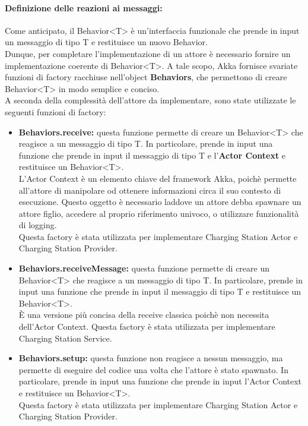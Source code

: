 \paragraph{Definizione delle reazioni ai messaggi:}
Come anticipato, il Behavior<T> è un'interfaccia funzionale che prende in input un messaggio di tipo T e restituisce un nuovo Behavior.\\
Dunque, per completare l'implementazione di un attore è necessario fornire un implementazione coerente di Behavior<T>. A tale scopo, Akka fornisce svariate funzioni di factory racchiuse nell'object \textbf{Behaviors}, che permettono di creare Behavior<T> in modo semplice e conciso.\\
A seconda della complessità dell'attore da implementare, sono state utilizzate le seguenti funzioni di factory:
\begin{itemize}
      \item \textbf{Behaviors.receive:} questa funzione permette di creare un Behavior<T> che reagisce a un messaggio di tipo T. In particolare, prende in input una funzione che prende in input il messaggio di tipo T e l'\textbf{Actor Context} e restituisce un Behavior<T>.\\
            L'Actor Context è un elemento chiave del framework Akka, poichè permette all'attore di manipolare od ottenere informazioni circa il suo contesto di esecuzione. Questo oggetto è necessario laddove un attore debba spawnare un attore figlio, accedere al proprio riferimento univoco, o utilizzare funzionalità di logging.\\
            Questa factory è stata utilizzata per implementare Charging Station Actor e Charging Station Provider.
      \item \textbf{Behaviors.receiveMessage:} questa funzione permette di creare un Behavior<T> che reagisce a un messaggio di tipo T. In particolare, prende in input una funzione che prende in input il messaggio di tipo T e restituisce un Behavior<T>.\\
            È una versione più concisa della receive classica poichè non necessita dell'Actor Context. Questa factory è stata utilizzata per implementare Charging Station Service.
      \item \textbf{Behaviors.setup:} questa funzione non reagisce a nessun messaggio, ma permette di eseguire del codice una volta che l'attore è stato spawnato. In particolare, prende in input una funzione che prende in input l'Actor Context e restituisce un Behavior<T>.\\
            Questa factory è stata utilizzata per implementare Charging Station Actor e Charging Station Provider.	
\end{itemize}

